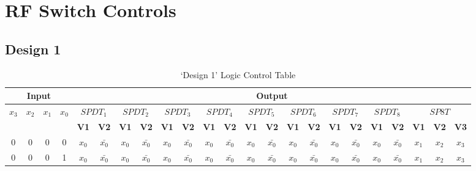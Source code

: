 \documentclass[12pt,openany,a4paper]{book}
\begin{document}
\chapter{RF Switch Controls}		
\begin{landscape}
\section{Design 1}	\label{sec:logic_design1}
\begin{table}[H]
  \centering
  \caption{`Design 1' Logic Control Table}
    \begin{tabular}{|cccc|ccccccccccccccccccc|}
    \hline
    \multicolumn{4}{|c|}{\textbf{Input}} & \multicolumn{19}{c|}{\textbf{Output}} \\
    \hline
    \multicolumn{1}{|c|}{\multirow{2}[4]{*}{\boldmath{}\textbf{$x_3$}\unboldmath{}}} & \multicolumn{1}{c|}{\multirow{2}[4]{*}{\boldmath{}\textbf{$x_2$}\unboldmath{}}} & \multicolumn{1}{c|}{\multirow{2}[4]{*}{\boldmath{}\textbf{$x_1$}\unboldmath{}}} & \multirow{2}[4]{*}{\boldmath{}\textbf{$x_0$}\unboldmath{}} & \multicolumn{2}{c|}{\textbf{$SPDT_1$}} & \multicolumn{2}{c|}{\textbf{$SPDT_2$}} & \multicolumn{2}{c|}{\textbf{$SPDT_3$}} & \multicolumn{2}{c|}{\textbf{$SPDT_4$}} & \multicolumn{2}{c|}{\textbf{$SPDT_5$}} & \multicolumn{2}{c|}{\textbf{$SPDT_6$}} & \multicolumn{2}{c|}{\textbf{$SPDT_7$}} & \multicolumn{2}{c|}{\textbf{$SPDT_8$}} & \multicolumn{3}{c|}{\textbf{$SP8T$}} \\
\cline{5-23}    \multicolumn{1}{|c|}{} & \multicolumn{1}{c|}{} & \multicolumn{1}{c|}{} &       & \multicolumn{1}{c|}{\textbf{V1}} & \multicolumn{1}{c|}{\textbf{V2}} & \multicolumn{1}{c|}{\textbf{V1}} & \multicolumn{1}{c|}{\textbf{V2}} & \multicolumn{1}{c|}{\textbf{V1}} & \multicolumn{1}{c|}{\textbf{V2}} & \multicolumn{1}{c|}{\textbf{V1}} & \multicolumn{1}{c|}{\textbf{V2}} & \multicolumn{1}{c|}{\textbf{V1}} & \multicolumn{1}{c|}{\textbf{V2}} & \multicolumn{1}{c|}{\textbf{V1}} & \multicolumn{1}{c|}{\textbf{V2}} & \multicolumn{1}{c|}{\textbf{V1}} & \multicolumn{1}{c|}{\textbf{V2}} & \multicolumn{1}{c|}{\textbf{V1}} & \multicolumn{1}{c|}{\textbf{V2}} & \multicolumn{1}{c|}{\textbf{V1}} & \multicolumn{1}{c|}{\textbf{V2}} & \textbf{V3} \\
    \hline
    0     & 0     & 0     & 0     & $x_0$ & $\bar{x_0}$ & $x_0$ & $\bar{x_0}$ & $x_0$ & $\bar{x_0}$ & $x_0$ & $\bar{x_0}$ & $x_0$ & $\bar{x_0}$ & $x_0$ & $\bar{x_0}$ & $x_0$ & $\bar{x_0}$ & $x_0$ & $\bar{x_0}$ & $x_1$ & $x_2$ & $x_3$ \\
    0     & 0     & 0     & 1     & $x_0$ & $\bar{x_0}$ & $x_0$ & $\bar{x_0}$ & $x_0$ & $\bar{x_0}$ & $x_0$ & $\bar{x_0}$ & $x_0$ & $\bar{x_0}$ & $x_0$ & $\bar{x_0}$ & $x_0$ & $\bar{x_0}$ & $x_0$ & $\bar{x_0}$ & $x_1$ & $x_2$ & $x_3$ \\

\end{tabular}
\end{table}
\end{landscape}
\end{document}
